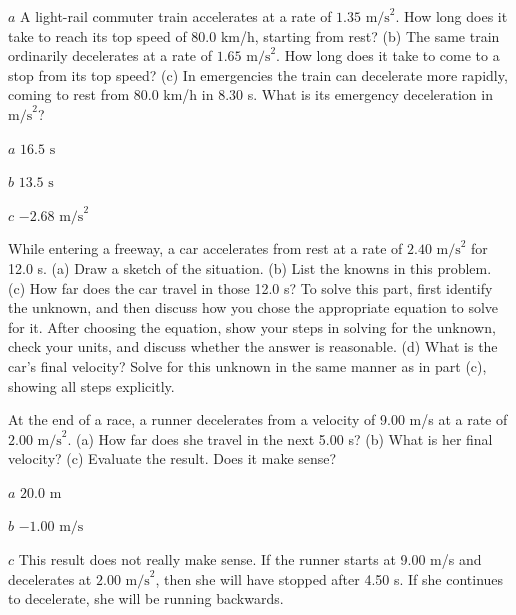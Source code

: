 \documentclass[
]{book}
\newenvironment{problems-exercises}{}{}
\newenvironment{tinysection}{}{}
\begin{document}
\begin{problems-exercises}
\hypertarget{fs-id1164906424347}{}
\leavevmode\hypertarget{fs-id1164906424350}{}%
\(a\) A light-rail commuter train accelerates at a rate of
\({1\text{.}\text{35\ m/s}^{2}}{}\). How long does it take to reach its
top speed of 80.0 km/h, starting from rest? (b) The same train
ordinarily decelerates at a rate of \({1\text{.}\text{65\ m/s}^{2}}{}\).
How long does it take to come to a stop from its top speed? (c) In
emergencies the train can decelerate more rapidly, coming to rest from
80.0 km/h in 8.30 s. What is its emergency deceleration in
\(\text{m/s}^{2}{}\)?

\leavevmode\hypertarget{fs-id1164906496443}{}%
\(a\) \({\text{16}\text{.}\text{5\ s}}{}\)

\(b\) \({\text{13}\text{.}\text{5\ s}}{}\)

\(c\) \({{- 2}\text{.}\text{68\ m/s}^{2}}{}\)

\hypertarget{fs-id1164906441407}{}
\leavevmode\hypertarget{fs-id1164906441410}{}%
While entering a freeway, a car accelerates from rest at a rate of
\({2\text{.}\text{40\ m/s}^{2}}{}\) for 12.0 s. (a) Draw a sketch of the
situation. (b) List the knowns in this problem. (c) How far does the car
travel in those 12.0 s? To solve this part, first identify the unknown,
and then discuss how you chose the appropriate equation to solve for it.
After choosing the equation, show your steps in solving for the unknown,
check your units, and discuss whether the answer is reasonable. (d) What
is the car's final velocity? Solve for this unknown in the same manner
as in part (c), showing all steps explicitly.

\hypertarget{fs-id1164906459799}{}
\leavevmode\hypertarget{fs-id1164906444281}{}%
At the end of a race, a runner decelerates from a velocity of 9.00 m/s
at a rate of \({2\text{.}\text{00\ m/s}^{2}}{}\). (a) How far does she
travel in the next 5.00 s? (b) What is her final velocity? (c) Evaluate
the result. Does it make sense?

\leavevmode\hypertarget{fs-id1164906453162}{}%
\(a\) \({\text{20}\text{.}\text{0\ m}}{}\)

\(b\) \({{- 1}\text{.}\text{00\ m/s}}{}\)

\(c\) This result does not really make sense. If the runner starts at
9.00 m/s and decelerates at \({2\text{.}\text{00\ m/s}^{2}}{}\), then she
will have stopped after 4.50 s. If she continues to decelerate, she will
be running backwards.

\hypertarget{fs-id1164906435065}{}
\hypertarget{fs-id1164906435068}{}
\begin{tinysection}


\end{tinysection}
\end{problems-exercises}
\end{document}

